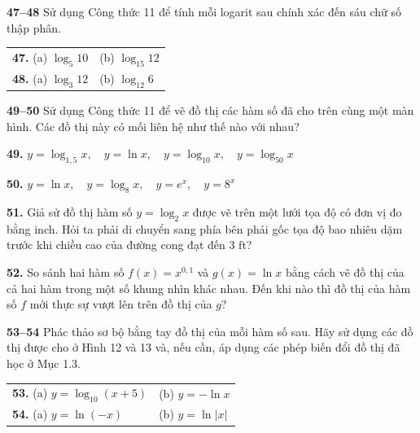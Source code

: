 \begin{minipage}[t]{0.485\textwidth}
\vspace{1.2ex}
\noindent
\textbf{\textsf{\color{stewartcyan}47--48}} Sử dụng Công thức 11 để tính mỗi logarit sau chính xác đến sáu chữ số thập phân.

\vspace{0.4ex}
\noindent
\begin{tabularx}{\linewidth}{@{}X X@{}}
\textbf{47.} (a) $\log_5 10$ & (b) $\log_{15} 12$ \\[0.5ex]
\textbf{48.} (a) $\log_3 12$ & (b) $\log_{12} 6$
\end{tabularx}

\vspace{1.2ex}
\noindent
{\color{stewartcyan}\faDesktop}\; \textbf{\textsf{\color{stewartcyan}49--50}} Sử dụng Công thức 11 để vẽ đồ thị các hàm số đã cho trên cùng một màn hình. Các đồ thị này có mối liên hệ như thế nào với nhau?

\vspace{0.4ex}
\noindent
\textbf{49.} $y = \log_{1{,}5} x,\quad y = \ln x,\quad y = \log_{10} x,\quad y = \log_{50} x$

\vspace{0.6ex}
\noindent
\textbf{50.} $y = \ln x,\quad y = \log_8 x,\quad y = e^x,\quad y = 8^x$

\vspace{1.2ex}
\noindent
\textbf{51.} Giả sử đồ thị hàm số $y = \log_2 x$ được vẽ trên một lưới tọa độ có đơn vị đo bằng inch. Hỏi ta phải di chuyển sang phía bên phải gốc tọa độ bao nhiêu dặm trước khi chiều cao của đường cong đạt đến $3\text{ ft}$?

\vspace{1.2ex}
\noindent
{\color{stewartcyan}\faDesktop}\; \textbf{52.} So sánh hai hàm số $f(x) = x^{0{,}1}$ và $g(x) = \ln x$ bằng cách vẽ đồ thị của cả hai hàm trong một số khung nhìn khác nhau. Đến khi nào thì đồ thị của hàm số $f$ mới thực sự vượt lên trên đồ thị của $g$?

\vspace{1.2ex}
\noindent
\textbf{\textsf{\color{stewartcyan}53--54}} Phác thảo sơ bộ bằng tay đồ thị của mỗi hàm số sau. Hãy sử dụng các đồ thị được cho ở Hình 12 và 13 và, nếu cần, áp dụng các phép biến đổi đồ thị đã học ở Mục 1.3.

\vspace{0.4ex}
\noindent
\begin{tabularx}{\linewidth}{@{}X X@{}}
\textbf{53.} (a) $y = \log_{10}(x+5)$ & (b) $y = -\ln x$ \\[0.5ex]
\textbf{54.} (a) $y = \ln(-x)$ & (b) $y = \ln|x|$
\end{tabularx}
\end{minipage}

\vfill
\noindent{\color{black!70}\rule{\textwidth}{0.4pt}}

\vspace{0.3ex}
